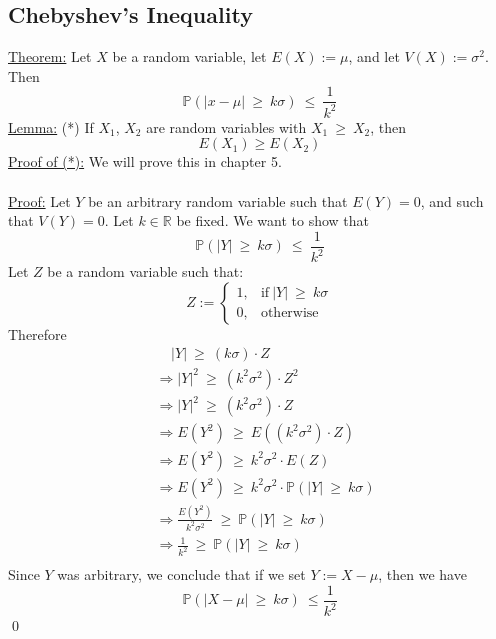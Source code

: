\documentclass{article}
\newcommand{\R}{\mathbb{R}}
\newcommand{\bbP}{\mathbb{P}}
\newcommand{\imply}{\Rightarrow}
\newcommand{\x}{\cdot}
\begin{document}
\subsection{Chebyshev's Inequality}
\underline{Theorem:} Let $X$ be a random variable, let $E(X) := \mu$, and let $V(X) := \sigma^{2}$. Then
\[\bbP(|x-\mu|\ \geq\ k\sigma)\ \leq\ \frac{1}{k^{2}}\]
\underline{Lemma:} (*) If $X_{1}$, $X_{2}$ are random variables with $X_{1}\ \geq\  X_{2}$, then
\[E(X_{1}) \geq E(X_{2})\]
\underline{Proof of (*):} We will prove this in chapter 5.\\\\
\underline{Proof:} Let $Y$ be an arbitrary random variable such that $E(Y) = 0$, and such that $V(Y) = 0$. Let $k \in \R$ be fixed. We want to show that
\[\bbP(|Y|\ \geq\ k\sigma)\ \leq\ \frac{1}{k^{2}}\]
Let $Z$ be a random variable such that:
\[Z :=
\begin{cases}
	1, &\text{if}\ |Y|\ \geq\ k\sigma\\
	0, &\text{otherwise}
\end{cases}\]
Therefore
\begin{align*}
	&\ \ \ \ \ |Y|\ \geq\ (k\sigma)\x Z\\
	&\imply |Y|^{2}\ \geq\ (k^{2}\sigma^{2})\x Z^{2}\\
	&\imply |Y|^{2}\ \geq\ (k^{2}\sigma^{2})\x Z\\
	&\imply E(Y^{2})\ \geq\ E((k^{2}\sigma^{2})\x Z)\\
	&\imply E(Y^{2})\ \geq\ k^{2}\sigma^{2}\x E(Z)\\
	&\imply E(Y^{2})\ \geq\ k^{2}\sigma^{2}\x \bbP(|Y|\ \geq\ k\sigma)\\
	&\imply \frac{E(Y^{2})}{k^{2}\sigma^{2}}\ \geq\ \bbP(|Y|\ \geq\ k\sigma)\\
	&\imply \frac{1}{k^{2}}\ \geq\ \bbP(|Y|\ \geq\ k\sigma)\\
\end{align*}
Since $Y$ was arbitrary, we conclude that if we set $Y := X-\mu$, then we have
\[\bbP(|X-\mu|\ \geq\ k\sigma)\ \leq \frac{1}{k^{2}}\]
\qed
\end{document}
